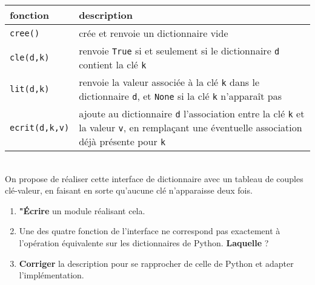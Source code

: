 \documentclass[a4paper,17pt]{extarticle}
\newenvironment{eleve}%
{\begin{activite}\color{noiramu}\\[-0.5cm]}
{\end{activite}}
\providecommand{\tightlist}{%
      \setlength{\itemsep}{0pt}\setlength{\parskip}{0pt}}
\begin{document}
\begin{longtable}[]{@{}ll@{}}
\toprule
\begin{minipage}[b]{0.47\columnwidth}\raggedright
fonction\strut
\end{minipage} & \begin{minipage}[b]{0.47\columnwidth}\raggedright
description\strut
\end{minipage}\tabularnewline
\midrule
\endhead
\begin{minipage}[t]{0.47\columnwidth}\raggedright
\texttt{cree()}\strut
\end{minipage} & \begin{minipage}[t]{0.47\columnwidth}\raggedright
crée et renvoie un dictionnaire vide\strut
\end{minipage}\tabularnewline
\begin{minipage}[t]{0.47\columnwidth}\raggedright
\texttt{cle(d,k)}\strut
\end{minipage} & \begin{minipage}[t]{0.47\columnwidth}\raggedright
renvoie \texttt{True} si et seulement si le dictionnaire \texttt{d}
contient la clé \texttt{k}\strut
\end{minipage}\tabularnewline
\begin{minipage}[t]{0.47\columnwidth}\raggedright
\texttt{lit(d,k)}\strut
\end{minipage} & \begin{minipage}[t]{0.47\columnwidth}\raggedright
renvoie la valeur associée à la clé \texttt{k} dans le dictionnaire
\texttt{d}, et \texttt{None} si la clé \texttt{k} n'apparaît pas\strut
\end{minipage}\tabularnewline
\begin{minipage}[t]{0.47\columnwidth}\raggedright
\texttt{ecrit(d,k,v)}\strut
\end{minipage} & \begin{minipage}[t]{0.47\columnwidth}\raggedright
ajoute au dictionnaire \texttt{d} l'association entre la clé \texttt{k}
et la valeur \texttt{v}, en remplaçant une éventuelle association déjà
présente pour \texttt{k}\strut
\end{minipage}\tabularnewline
\bottomrule
\end{longtable}
\begin{eleve}
    On propose de réaliser cette interface de dictionnaire avec un tableau
de couples clé-valeur, en faisant en sorte qu'aucune clé n'apparaisse
deux fois.

\begin{enumerate}
\def\labelenumi{\arabic{enumi}.}
\tightlist
\item
  \textbf{"Écrire} un module réalisant cela.
\item
  Une des quatre fonction de l'interface ne correspond pas exactement à
  l'opération équivalente sur les dictionnaires de Python.
  \textbf{Laquelle} ?
\item
  \textbf{Corriger} la description pour se rapprocher de celle de Python
  et adapter l'implémentation.
\end{enumerate}
        
        \end{eleve}

    
    
    
\end{document}
